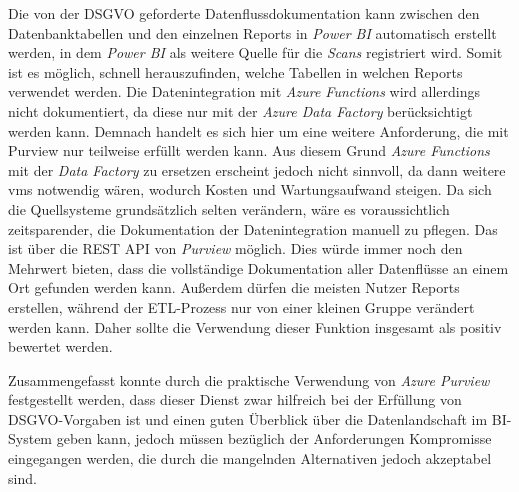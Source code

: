 Die von der DSGVO geforderte Datenflussdokumentation kann zwischen den Datenbanktabellen und den einzelnen Reports in \textit{Power BI} automatisch erstellt werden, in dem \textit{Power BI} als weitere Quelle für die \textit{Scans} registriert wird. Somit ist es möglich, schnell herauszufinden, welche Tabellen in welchen Reports verwendet werden. Die Datenintegration mit \textit{Azure Functions} wird allerdings nicht dokumentiert, da diese nur mit der \textit{Azure Data Factory} berücksichtigt werden kann. Demnach handelt es sich hier um eine weitere Anforderung, die mit Purview nur teilweise erfüllt werden kann. Aus diesem Grund \textit{Azure Functions} mit der \textit{Data Factory} zu ersetzen erscheint jedoch nicht sinnvoll, da dann weitere \acp{vm} notwendig wären, wodurch Kosten und Wartungsaufwand steigen. Da sich die Quellsysteme grundsätzlich selten verändern, wäre es voraussichtlich zeitsparender, die Dokumentation der Datenintegration manuell zu pflegen. Das ist über die REST API von \textit{Purview} möglich. Dies würde immer noch den Mehrwert bieten, dass die vollständige Dokumentation aller Datenflüsse an einem Ort gefunden werden kann. Außerdem dürfen die meisten Nutzer Reports erstellen, während der ETL-Prozess nur von einer kleinen Gruppe verändert werden kann. Daher sollte die Verwendung dieser Funktion insgesamt als positiv bewertet werden. \cite[vgl.][]{lesteve_definitive_2021, msdoc_22_purview_sensLabel, riscutia_data_2021, borosch_cloud_2021}

Zusammengefasst konnte durch die praktische Verwendung von \textit{Azure Purview} festgestellt werden, dass dieser Dienst zwar hilfreich bei der Erfüllung von DSGVO-Vorgaben ist und einen guten Überblick über die Datenlandschaft im BI-System geben kann, jedoch müssen bezüglich der Anforderungen Kompromisse eingegangen werden, die durch die mangelnden Alternativen jedoch akzeptabel sind.